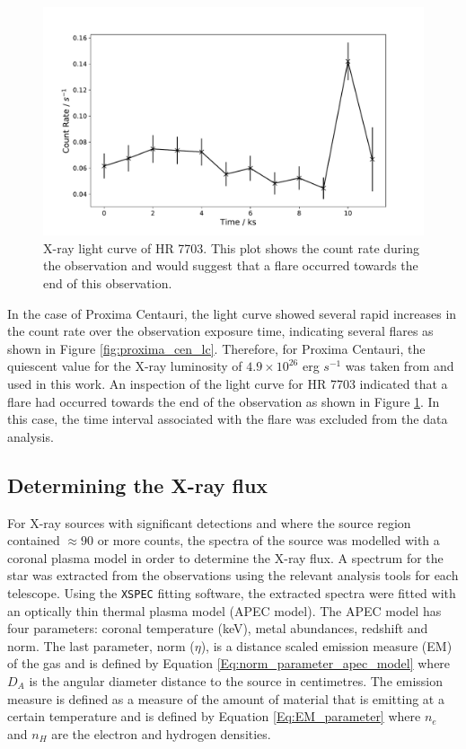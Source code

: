 \begin{figure}
    \centering
    \includegraphics[scale=0.55]{Figures/3-Xray_age/HR7703_lc.pdf}
    \caption[X-ray light curve of HR 7703]{X-ray light curve of HR 7703. This plot shows the count rate during the observation and would suggest that a flare occurred towards the end of this observation.}
    \label{fig:HR7703_lc}
\end{figure}

In the case of Proxima Centauri, the light curve showed several rapid increases in the count rate over the observation exposure time, indicating several flares as shown in Figure \ref{fig:proxima_cen_lc}. Therefore, for Proxima Centauri, the quiescent value for the X-ray luminosity of $4.9 \times 10^{26}$ erg $s^{-1}$ was taken from \citet{Fuhrmeister_etal_2011} and used in this work. An inspection of the light curve for HR 7703 indicated that a flare had occurred towards the end of the observation as shown in Figure \ref{fig:HR7703_lc}. In this case, the time interval associated with the flare was excluded from the data analysis.

\subsection{Determining the X-ray flux}
\label{Section_Determining_Xray_flux}
For X-ray sources with significant detections and where the source region contained $\approx 90$ or more counts, the spectra of the source was modelled with a coronal plasma model in order to determine the X-ray flux. A spectrum for the star was extracted from the observations using the relevant analysis tools for each telescope. Using the \texttt{XSPEC} fitting software, the extracted spectra were fitted with an optically thin thermal plasma model (APEC model). The APEC model has four parameters: coronal temperature (keV), metal abundances, redshift and norm. The last parameter, norm ($\eta$), is a distance scaled emission measure (EM) of the gas and is defined by Equation \ref{Eq:norm_parameter_apec_model} where $D_{A}$ is the angular diameter distance to the source in centimetres. The emission measure is defined as a measure of the amount of material that is emitting at a certain temperature and is defined by Equation \ref{Eq:EM_parameter} where $n_{e}$ and $n_{H}$ are the electron and hydrogen densities. 

